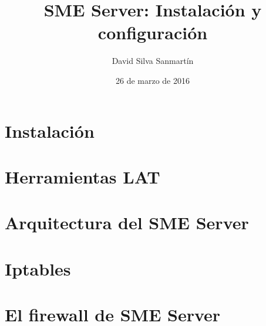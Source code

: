 \documentclass[12pt]{report}
\title{SME Server: Instalación y configuración}
\author{David Silva Sanmartín}
\date{26 de marzo de 2016}
\begin{document}


%

\tableofcontents

%

\chapter{Instalación}


%

\chapter{Herramientas LAT}


\chapter{Arquitectura del SME Server}


\chapter{Iptables}


\chapter{El firewall de SME Server}



%

%



\end{document}
